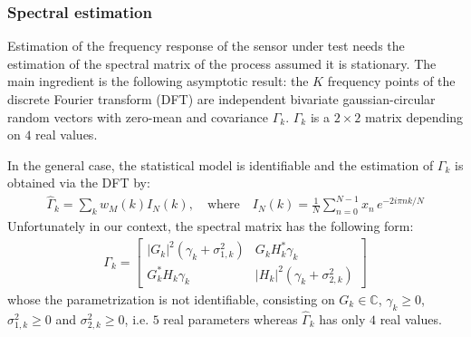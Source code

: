 
\subsubsection{Spectral estimation}
\label{ann:spectral-estimation}
Estimation of the frequency response of the sensor under test needs the estimation of the spectral matrix of the process assumed it is stationary. The main ingredient is the following asymptotic result:  the $K$ 
 frequency points of the discrete Fourier transform (DFT) are independent bivariate gaussian-circular random vectors with zero-mean and covariance $\Gamma_k$. $\Gamma_k$ is a $2\times 2$ matrix depending on $4$ real values. 

In the general case, the statistical model is identifiable and the estimation of $\Gamma_k$ is obtained via the DFT by:
 \begin{eqnarray}
\label{eq:hatGammak}
\widehat\Gamma_k = \sum_k w_M(k)I_N(k), \quad\mathrm{where}\quad
I_N(k) = \frac{1}{N}\sum_{n=0}^{N-1}x_n\,e^{-2i\pi nk/N}
\end{eqnarray}
Unfortunately in our context, the spectral matrix has the following form:
 \begin{eqnarray}
\label{eq:GammakinourModel}
\Gamma_k = \begin{bmatrix}
|G_k|^2(\gamma_k+\sigma^2_{1,k})&G_kH_k^*\gamma_k\\
G_k^*H_k\gamma_k&|H_k|^2(\gamma_k+\sigma^2_{2,k})
\end{bmatrix}
\end{eqnarray}
whose the parametrization is not identifiable, consisting on $G_k\in\mathds{C}$, $\gamma_k\geq 0$, $\sigma^2_{1,k}\geq 0$ and $\sigma^2_{2,k}\geq 0$, i.e. $5$ real parameters whereas $\widehat\Gamma_k$ has only $4$ real values.
